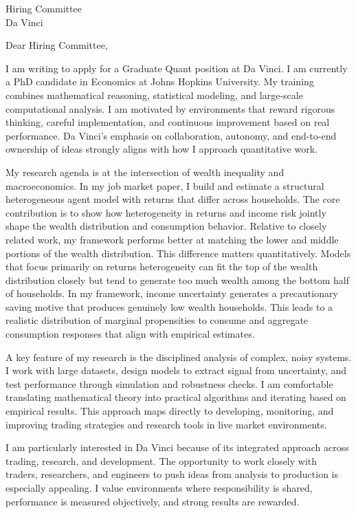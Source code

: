 \documentclass[11pt]{letter}
\begin{document}
\begin{letter}{Hiring Committee \\ Da Vinci}

\opening{Dear Hiring Committee,}

I am writing to apply for a Graduate Quant position at Da Vinci. I am currently a PhD candidate in Economics at Johns Hopkins University. My training combines mathematical reasoning, statistical modeling, and large-scale computational analysis. I am motivated by environments that reward rigorous thinking, careful implementation, and continuous improvement based on real performance. Da Vinci’s emphasis on collaboration, autonomy, and end-to-end ownership of ideas strongly aligns with how I approach quantitative work.

My research agenda is at the intersection of wealth inequality and macroeconomics. In my job market paper, I build and estimate a structural heterogeneous agent model with returns that differ across households. The core contribution is to show how heterogeneity in returns and income risk jointly shape the wealth distribution and consumption behavior. Relative to closely related work, my framework performs better at matching the lower and middle portions of the wealth distribution. This difference matters quantitatively. Models that focus primarily on returns heterogeneity can fit the top of the wealth distribution closely but tend to generate too much wealth among the bottom half of households. In my framework, income uncertainty generates a precautionary saving motive that produces genuinely low wealth households. This leads to a realistic distribution of marginal propensities to consume and aggregate consumption responses that align with empirical estimates.

A key feature of my research is the disciplined analysis of complex, noisy systems. I work with large datasets, design models to extract signal from uncertainty, and test performance through simulation and robustness checks. I am comfortable translating mathematical theory into practical algorithms and iterating based on empirical results. This approach maps directly to developing, monitoring, and improving trading strategies and research tools in live market environments.

I am particularly interested in Da Vinci because of its integrated approach across trading, research, and development. The opportunity to work closely with traders, researchers, and engineers to push ideas from analysis to production is especially appealing. I value environments where responsibility is shared, performance is measured objectively, and strong results are rewarded.


\end{letter}
\end{document}
